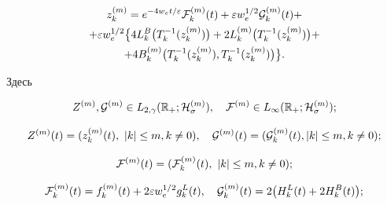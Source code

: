 \begin{multline}

z^{(m)}_k= e^{-4w_e t/\varepsilon} {\cal F}^{(m)}_k(t)

+\varepsilon w_e^{1/2} {\cal G}^{(m)}_k(t)+

\\

+\varepsilon w_e^{1/2}

\bigl\{4 L_k^B \bigl(T^{-1}_k(z^{(m)}_k) \bigr)+

2L^{(m)}_k \bigl(T^{-1}_k(z^{(m)}_k)\bigr)+

\\

+4B^{(m)}_k \bigl(T^{-1}_k(z^{(m)}_k), T^{-1}_k(z^{(m)}_k)\bigr)\bigr\}.

\label{duh:0nonlin}

\end{multline}

Здесь

$$

Z^{(m)}, {\cal G}^{(m)}\in L_{2,\gamma}(\mathbb R_{+};{\cal H}^{(m)}_{\sigma}), \quad 

{\cal F}^{(m)}\in L_\infty(\mathbb R_{+};{\cal H}^{(m)}_{\sigma});

$$

$$

Z^{(m)}(t)=(z^{(m)}_k(t),~|k|\le m, k\ne0),

\quad 

{\cal G}^{(m)}(t)=({\cal G}^{(m)}_k(t), |k|\le m, k\ne0);$$ 

$${\cal F}^{(m)}(t)= ({\cal F}^{(m)}_k(t),~|k|\le m, k\ne0);$$

$$

{\cal F}^{(m)}_k(t)=f^{(m)}_k(t)+2\varepsilon w_e^{1/2} g^L_k(t),

\quad 

 {\cal G}^{(m)}_k(t)=2\bigl(H^L_k(t)+2H^B_k(t)\bigr);

$$

